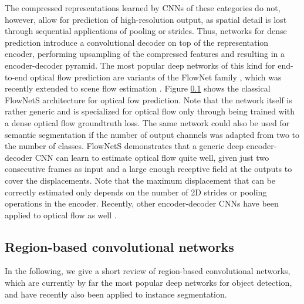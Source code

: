 The compressed representations learned by CNNs of these categories do not, however, allow
for prediction of high-resolution output, as spatial detail is lost through sequential applications
of pooling or strides.
Thus, networks for dense prediction introduce a convolutional decoder on top of the representation encoder,
performing upsampling of the compressed features and resulting in a encoder-decoder pyramid.
The most popular deep networks of this kind for end-to-end optical flow prediction
are variants of the FlowNet family \cite{}, which was recently extended to scene flow estimation \cite{}.
Figure \ref{} shows the classical FlowNetS architecture for optical fow prediction.
Note that the network itself is rather generic and is specialized for optical flow only through being trained
with a dense optical flow groundtruth loss. The same network could also be used for semantic segmentation if
the number of output channels was adapted from two to the number of classes. %
FlowNetS demonstrates that a generic deep encoder-decoder CNN can learn to estimate optical flow quite well,
given just two consecutive frames as input and a large enough receptive field at the outputs to cover the displacements.
Note that the maximum displacement that can be correctly estimated only depends on the number of 2D strides or pooling
operations in the encoder.
Recently, other encoder-decoder CNNs have been applied to optical flow as well \cite{}. %




\subsection{Region-based convolutional networks}
In the following, we give a short review of region-based convolutional networks, which are currently by far the
most popular deep networks for object detection, and have recently also been applied to instance segmentation.

